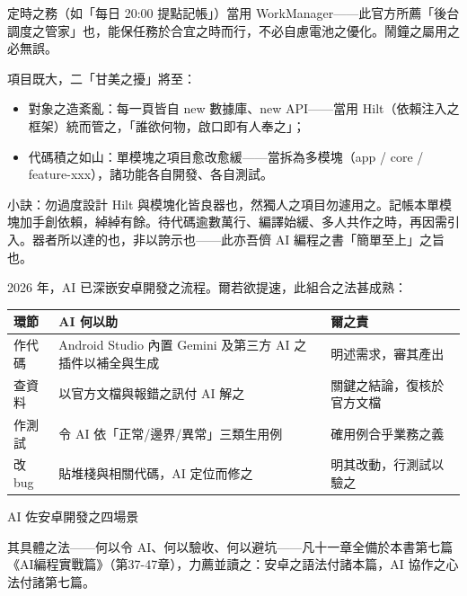 定時之務（如「每日 20:00 提點記帳」）當用 WorkManager——此官方所薦「後台調度之管家」也，能保任務於合宜之時而行，不必自慮電池之優化。鬧鐘之屬用之必無誤。


項目既大，二「甘美之擾」將至：

\begin{itemize}
  \item 對象之造紊亂：每一頁皆自 new 數據庫、new API——當用 Hilt（依賴注入之框架）統而管之，「誰欲何物，啟口即有人奉之」；
  \item 代碼積之如山：單模塊之項目愈改愈緩——當拆為多模塊（app / core / feature-xxx），諸功能各自開發、各自測試。
\end{itemize}

\begin{tcbinfo}{小訣：勿過度設計}
Hilt 與模塊化皆良器也，然獨人之項目勿遽用之。記帳本單模塊加手創依賴，綽綽有餘。待代碼逾數萬行、編譯始緩、多人共作之時，再因需引入。器者所以達的也，非以誇示也——此亦吾儕 AI 編程之書「簡單至上」之旨也。

\end{tcbinfo}


2026 年，AI 已深嵌安卓開發之流程。爾若欲提速，此組合之法甚成熟：

\begin{center}
\begin{tabularx}{\linewidth}{|X|X|X|}
\hline
\textbf{環節} & \textbf{AI 何以助} & \textbf{爾之責} \tabularnewline
\hline
作代碼 & Android Studio 內置 Gemini 及第三方 AI 之插件以補全與生成 & 明述需求，審其產出 \tabularnewline
查資料 & 以官方文檔與報錯之訊付 AI 解之 & 關鍵之結論，復核於官方文檔 \tabularnewline
作測試 & 令 AI 依「正常/邊界/異常」三類生用例 & 確用例合乎業務之義 \tabularnewline
改 bug & 貼堆棧與相關代碼，AI 定位而修之 & 明其改動，行測試以驗之 \tabularnewline
\hline
\end{tabularx}
\end{center}

\begin{center}\small\color{gray}AI 佐安卓開發之四場景\end{center}

其具體之法——何以令 AI、何以驗收、何以避坑——凡十一章全備於本書第七篇《AI編程實戰篇》（第37-47章），力薦並讀之：安卓之語法付諸本篇，AI 協作之心法付諸第七篇。


